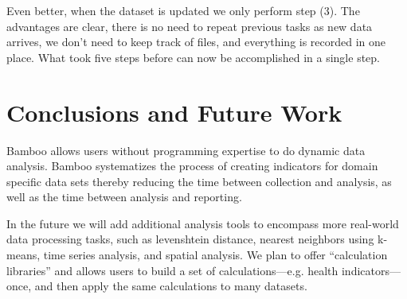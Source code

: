 \documentclass{acm_proc_article-sp}
\begin{document}
Even better, when the dataset is updated we only perform step (3).  The advantages are clear, there is no need to repeat previous tasks as new data arrives, we don’t need to keep track of files, and everything is recorded in one place.  What took five steps before can now be accomplished in a single step.

\section{Conclusions and Future Work}
Bamboo allows users without programming expertise to do dynamic data analysis.  Bamboo systematizes the process of creating indicators for domain specific data sets thereby reducing the time between collection and analysis, as well as the time between analysis and reporting.

In the future we will add additional analysis tools to encompass more real-world data processing tasks, such as levenshtein distance, nearest neighbors using k-means, time series analysis, and spatial analysis.  We plan to offer “calculation libraries” and allows users to build a set of calculations---e.g. health indicators---once, and then apply the same calculations to many datasets.


%

%
%

\balancecolumns
\end{document}
